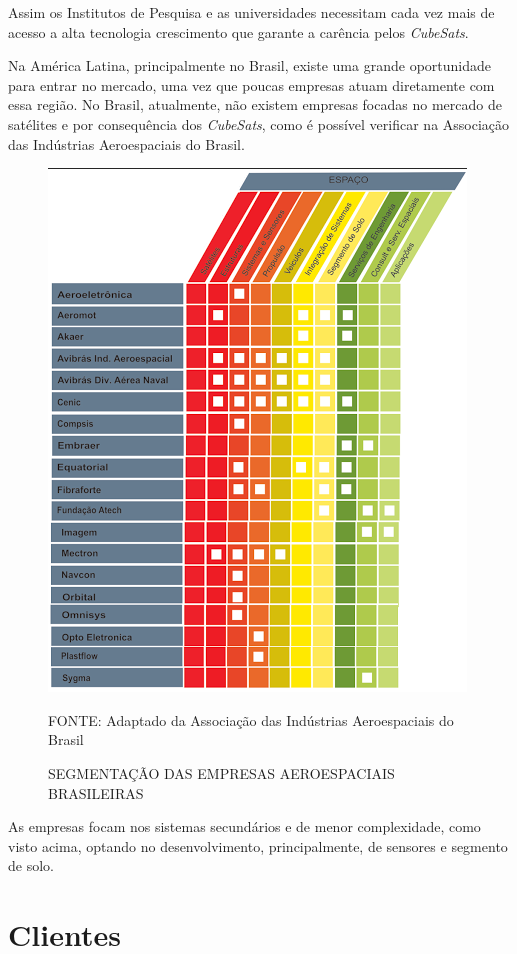 \documentclass[
	12pt,				%
	openright,			%
	oneside,			%
	a4paper,			%
	english,			%
	french,				%
	spanish,			%
	brazil				%
	]{abntex2}
\begin{document}
	Assim os Institutos de Pesquisa e as universidades necessitam cada vez mais de acesso a alta tecnologia crescimento que garante a carência pelos \textit{CubeSats}.
		
	Na América Latina, principalmente no Brasil, existe uma grande oportunidade para entrar no mercado, uma vez que poucas empresas atuam diretamente com essa região. No Brasil, atualmente, não existem empresas focadas no mercado de satélites e por consequência dos \textit{CubeSats}, como é possível verificar na Associação das Indústrias Aeroespaciais do Brasil.
	
	\begin{figure}[th]
		\caption{SEGMENTAÇÃO DAS EMPRESAS AEROESPACIAIS BRASILEIRAS}
		\centering
		\includegraphics[width=0.8\linewidth]{./figs/Figura_08}
			
		\begin{small}
			FONTE: Adaptado da Associação das Indústrias Aeroespaciais do Brasil
		\end{small}		
	\end{figure}
		
	As empresas focam nos sistemas secundários e de menor complexidade, como visto acima, optando no desenvolvimento, principalmente, de sensores e segmento de solo.
		
\section[Clientes]{Clientes}
\end{document}
